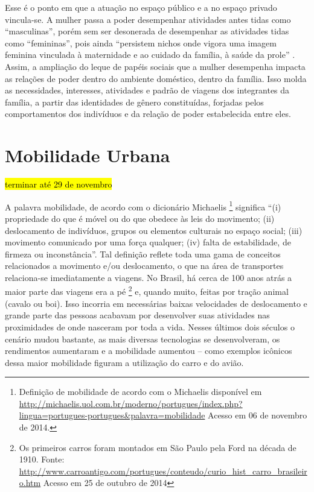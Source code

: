 
Esse é o ponto em que a atuação no espaço público e a no espaço privado vincula-se.
A mulher passa a poder desempenhar atividades antes tidas como ``masculinas'', porém sem ser desonerada de desempenhar as atividades tidas como ``femininas'', pois  ainda ``persistem nichos onde vigora uma imagem feminina vinculada à maternidade e ao cuidado da família, à saúde da prole'' \cite[p.94]{BLAY2001}. 
Assim, a ampliação do leque de papéis sociais que a mulher desempenha impacta as relações de poder dentro do ambiente doméstico, dentro da família. Isso molda as necessidades, interesses, atividades e padrão de viagens dos integrantes da família, a partir das identidades de gênero constituídas, forjadas pelos comportamentos dos indivíduos e da relação de poder estabelecida entre eles.

\clearpage
\section{Mobilidade Urbana}

\hl{terminar até 29 de novembro}

A palavra mobilidade, de acordo com o dicionário Michaelis
\footnote{Definição de mobilidade de acordo com o Michaelis disponível em \url{http://michaelis.uol.com.br/moderno/portugues/index.php?lingua=portugues-portugues&palavra=mobilidade} Acesso em 06 de novembro de 2014.}
significa ``(i) propriedade do que é móvel ou do que obedece às leis do movimento;
(ii) deslocamento de indivíduos, grupos ou elementos culturais no espaço social;
(iii) movimento comunicado por uma força qualquer;
(iv) falta de estabilidade, de firmeza ou inconstância''.
Tal definição reflete toda uma gama de conceitos relacionados a movimento e/ou deslocamento, o que na área de transportes relaciona-se imediatamente a viagens. No Brasil, há cerca de 100 anos atrás a maior parte das viagens era a pé
\footnote{Os primeiros carros foram montados em São Paulo pela Ford na década de 1910. Fonte: \url{http://www.carroantigo.com/portugues/conteudo/curio_hist_carro_brasileiro.htm} Acesso em 25 de outubro de 2014} 
e, quando muito, feitas por tração animal (cavalo ou boi).
Isso incorria em necessárias baixas velocidades de deslocamento e grande parte das pessoas acabavam por desenvolver suas atividades nas proximidades de onde nasceram por toda a vida. Nesses últimos dois séculos o cenário mudou bastante, as mais diversas tecnologias se desenvolveram, os rendimentos aumentaram e a mobilidade aumentou \cite{METZ2011, p.6} – como exemplos icônicos dessa maior mobilidade figuram a utilização do carro e do avião.

